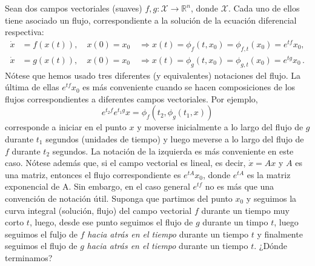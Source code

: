 Sean dos campos vectoriales (suaves) $f, g: \mathcal{X} \rightarrow \mathbb{R}^n$, donde $\mathcal{X}$. Cada uno de ellos tiene asociado un flujo, correspondiente a la solución de la ecuación diferencial respectiva:
\begin{equation*}
	\begin{aligned}
		\dot{x} & = f(x(t)), \quad x(0) = x_0 \quad \Rightarrow x(t) = \phi_f(t, x_0) = \phi_{f,t}(x_0) = e^{tf}x_0,    \\
		\dot{x} & = g(x(t)), \quad x(0) = x_0 \quad \Rightarrow x(t) = \phi_g(t, x_0) = \phi_{g,t}(x_0) = e^{tg}x_0 \,.
	\end{aligned}
\end{equation*}
Nótese que hemos usado tres diferentes (y equivalentes) notaciones del flujo. La última de ellas $e^{tf}x_0$ es más conveniente cuando se hacen composiciones de los flujos correspondientes a diferentes campos vectoriales. Por ejemplo,
\begin{equation*}
	e^{t_2f}e^{t_1g}x = \phi_f(t_2, \phi_g(t_1, x))
\end{equation*}
corresponde a iniciar en el punto $x$ y moverse inicialmente a lo largo del flujo de $g$ durante $t_1$ segundos (unidades de tiempo) y luego meverse a lo largo del flujo de $f$ durante $t_2$ segundos. La notación de la izquierda es más conveniente en este caso. Nótese además que, si el campo vectorial es lineal, es decir, $\dot{x} = Ax$ y $A$ es una matriz, entonces el flujo correspondiente es $e^{tA}x_0$, donde $e^{tA}$ es la matriz exponencial de A. Sin embargo, en el caso general $e^{tf}$ no es más que una convención de notación útil.
Suponga que partimos del punto $x_0$ y seguimos la curva integral (solución, flujo) del campo vectorial $f$ durante un tiempo muy corto $t$, luego, desde ese punto seguimos el flujo de $g$ durante un timpo $t$, luego seguimos el fuljo de $f$ \textit{hacia atrás en el tiempo} durante un tiempo $t$ y finalmente seguimos el flujo de $g$ \textit{hacia atrás en el tiempo} durante un tiempo $t$. ¿Dónde terminamos?\\

